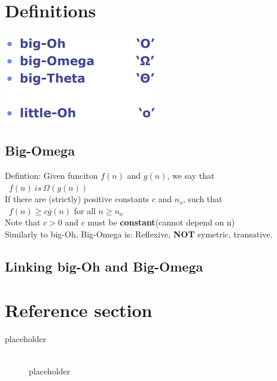 \documentclass{article}
\begin{document}
\section{Definitions}

\includegraphics[scale=0.8]{Selection_003.png}
\subsection{Big-Omega}
\begin{flushleft}
Defintion: Given funciton $f(n)$ and $g(n)$, we say that\\
\ $ f(n)\ is\ \Omega(g(n))$\\
If there are (strictly) positive constants $c$ and $n_o$, such that\\
\ $ f(n) \geq c g(n)$ for all $ n \geq n_o$\\
Note that $ c > 0$ and $c$ must be \textbf{constant}(cannot depend on n)\\
Similarly to big-Oh, Big-Omega is: Reflexive, \textbf{NOT} symetric, transative.
\end{flushleft}

\subsection{Linking big-Oh and Big-Omega}


\pagebreak
\section*{Reference section} \label{sec:reference}
\begin{description}
	\item[placeholder] \hfill \\ placeholder
\end{description}
\end{document}
